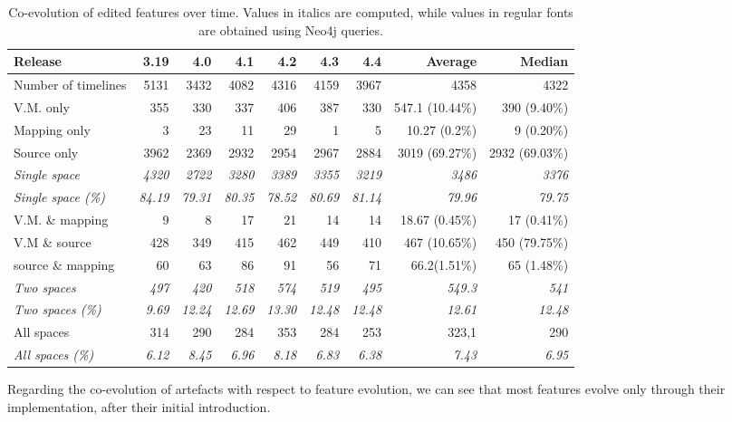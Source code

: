 \begin{table}[h]
\vspace{5mm}
\begin{adjustbox}{max width=\textwidth}
\begin{tabular}{|l|r|r|r|r|r|r||r|r|}
\hline
Release	 			 & 3.19 & 4.0 & 4.1 & 4.2 & 4.3 & 4.4 & Average & Median\\
\hline
Number of timelines		& 5131	& 3432 	& 4082	& 4316	&4159	&3967 & 4358	 & 4322\\
\hline
V.M. only				&355		&330		&337		&406		&387		&330	 & 547.1 (10.44\%)	& 390 (9.40\%)\\
Mapping only 			&3		&23		&11		&29		&1		&5		& 10.27 (0.2\%) & 9 (0.20\%)\\
Source only 				&3962	&2369	&2932	&2954	&2967	&2884	& 3019 (69.27\%) & 2932 (69.03\%)\\
\emph{Single space}		&\emph{4320}	&\emph{2722}	&\emph{3280}	&\emph{3389}	&\emph{3355}	&\emph{3219}	&\emph{3486} & \emph{3376}\\
\emph{Single space (\%)}	&\emph{84.19	}&\emph{79.31}	&\emph{80.35}	&\emph{78.52	}&\emph{80.69}	&\emph{81.14}	& \emph{79.96} & \emph{79.75}\\
\hline
V.M. \& mapping 			&9		&8		&17		&21		&14		&14	& 18.67 (0.45\%)	 & 17 (0.41\%)\\
V.M \&  source			&428		&349		&415		&462		&449		&410	 & 467 (10.65\%)	& 450 (79.75\%)\\
source \& mapping		&60		&63		&86		&91		&56		&71	& 66.2(1.51\%)	 & 65 (1.48\%)\\
\emph{Two spaces}			&\emph{497}		&\emph{420}		&\emph{518} &\emph{574}&\emph{519	}	&\emph{495}	& \emph{549.3} & \emph{541}	\\
\emph{Two spaces (\%)} &\emph{9.69}&\emph{12.24}&\emph{12.69	}&\emph{13.30}&\emph{12.48}&\emph{12.48} & \emph{12.61} & \emph{12.48}\\
\hline
All spaces 				&314		&290		&284		&353		&284		&253		& 323,1 & 290 \\
\emph{All spaces (\%)}	&\emph{6.12}	&\emph{8.45}	&\emph{6.96}	&\emph{8.18}	&\emph{6.83}	&\emph{6.38}	 & \emph{7.43} & \emph{6.95}\\
\hline
\end{tabular}
\end{adjustbox}
\caption{Co-evolution of edited features over time. Values in italics are computed, while values in regular fonts are obtained using Neo4j queries.}
\label{feature_evolution}
\end{table}

Regarding the co-evolution of artefacts with respect to feature evolution, we can see that most features evolve only through their implementation, after their initial introduction. 

